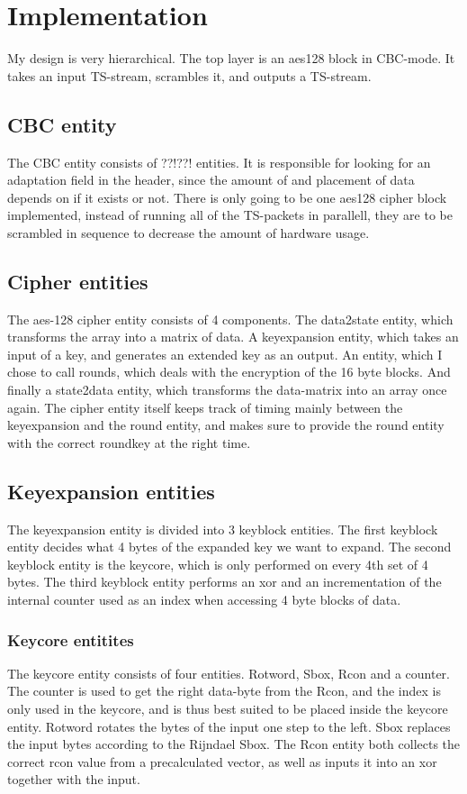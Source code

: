 \section{Implementation}
My design is very hierarchical. The top layer is an aes128 block in CBC-mode. 
It takes an input TS-stream, scrambles it, and outputs a TS-stream. 

\subsection{CBC entity}
The CBC entity consists of ??!??! entities. It is responsible for looking for an 
adaptation field in the header, since the amount of and placement of data depends
on if it exists or not. There is only going to be one aes128 cipher block 
implemented, instead of running all of the TS-packets in parallell, they are to 
be scrambled in sequence to decrease the amount of hardware usage.

\subsection{Cipher entities}
The aes-128 cipher entity consists of 4 components. The data2state entity, which 
transforms the array into a matrix of data. A keyexpansion entity, which takes 
an input of a key, and generates an extended key as an output. An entity, which I
chose to call rounds, which deals with the encryption of the 16 byte blocks. And 
finally a state2data entity, which transforms the data-matrix into an array once 
again. The cipher entity itself keeps track of timing mainly between the 
keyexpansion and the round entity, and makes sure to provide the round entity 
with the correct roundkey at the right time.

\subsection{Keyexpansion entities}
The keyexpansion entity is divided into 3 keyblock entities. The first keyblock 
entity decides what 4 bytes of the expanded key we want to expand. The second 
keyblock entity is the keycore, which is only performed on every 4th set of 
4 bytes. The third keyblock entity performs an xor and an incrementation of the 
internal counter used as an index when accessing 4 byte blocks of data.

\subsubsection{Keycore entitites}
The keycore entity consists of four entities. Rotword, Sbox, Rcon and a counter. 
The counter is used to get the right data-byte from the Rcon, and the index is 
only used in the keycore, and is thus best suited to be placed inside the 
keycore entity. Rotword rotates the bytes of the input one step to the left. 
Sbox replaces the input bytes according to the Rijndael Sbox. The Rcon entity 
both collects the correct rcon value from a precalculated vector, as well as 
inputs it into an xor together with the input.

